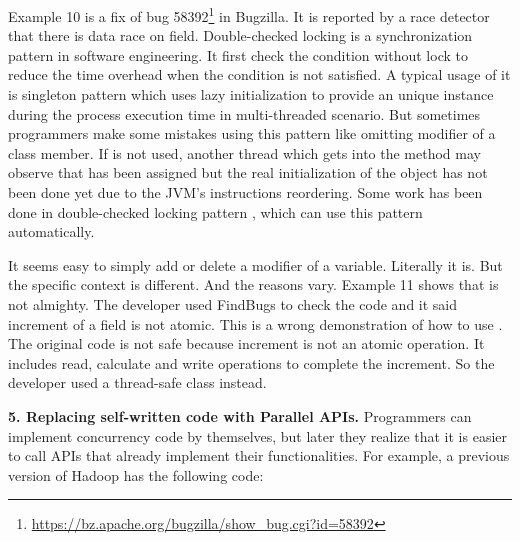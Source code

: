 Example 10 is a fix of bug 58392\footnote{\url{https://bz.apache.org/bugzilla/show_bug.cgi?id=58392}} in Bugzilla. It is reported by a race detector that there is data race on field. Double-checked locking is a synchronization pattern in software engineering. It first check the condition without lock to reduce the time overhead when the condition is not satisfied. A typical usage of it is singleton pattern which uses lazy initialization to provide an unique instance during the process execution time in multi-threaded scenario. But sometimes programmers make some mistakes using this pattern like omitting  modifier of a class member. If  is not used, another thread which gets into the method may observe that  has been assigned but the real initialization of the object has not been done yet due to the JVM's instructions reordering. Some work has been done in double-checked locking pattern \cite{conf/ispass/IshizakiDN14}, which can use this pattern automatically.



It seems easy to simply add or delete a  modifier of a variable. Literally it is. But the specific context is different. And the reasons vary. Example 11 shows that  is not almighty. The developer used FindBugs to check the code and it said increment of a  field is not atomic. This is a wrong demonstration of how to use . The original code is not safe because increment is not an atomic operation. It includes read, calculate and write operations to complete the increment. So the developer used a thread-safe class instead.

\noindent
\textbf{5. Replacing self-written code with Parallel APIs.} Programmers can implement concurrency code by themselves, but later they realize that it is easier to call APIs that already implement their functionalities. For example, a previous version of Hadoop has the following code:%

%

